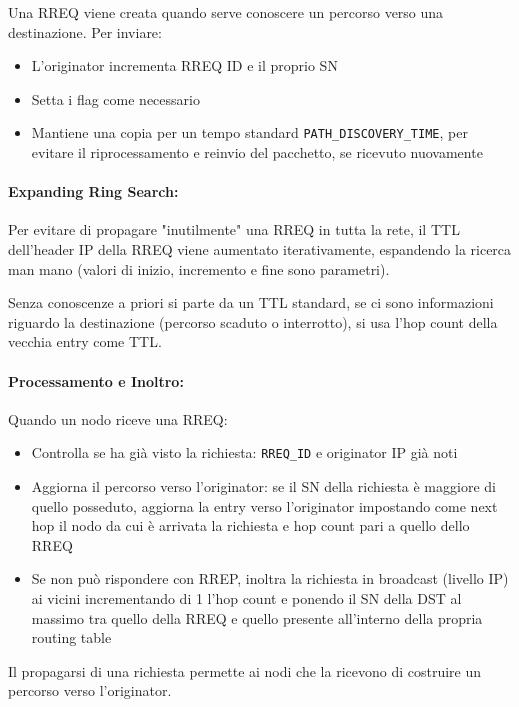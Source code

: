 Una RREQ viene creata quando serve conoscere un percorso verso una destinazione. Per inviare:
\begin{itemize}
    \item L'originator incrementa RREQ ID e il proprio SN
    
    \item Setta i flag come necessario 
    
    \item Mantiene una copia per un tempo standard \texttt{PATH\_DISCOVERY\_TIME}, per evitare il riprocessamento e reinvio del pacchetto, se ricevuto nuovamente
\end{itemize}

\paragraph{Expanding Ring Search:} Per evitare di propagare "inutilmente" una RREQ in tutta la rete, il TTL dell'header IP della RREQ viene aumentato iterativamente, espandendo la ricerca man mano (valori di inizio, incremento e fine sono parametri). 

Senza conoscenze a priori si parte da un TTL standard, se ci sono informazioni riguardo la destinazione (percorso scaduto o interrotto), si usa l'hop count della vecchia entry come TTL.

\paragraph{Processamento e Inoltro:} Quando un nodo riceve una RREQ: 
\begin{itemize}
    \item Controlla se ha già visto la richiesta: \texttt{RREQ\_ID} e originator IP già noti
    
    \item Aggiorna il percorso verso l'originator: se il SN della richiesta è maggiore di quello posseduto, aggiorna la entry verso l'originator impostando come next hop il nodo da cui è arrivata la richiesta e hop count pari a quello dello RREQ
    
    \item Se non può rispondere con RREP, inoltra la richiesta in broadcast (livello IP) ai vicini incrementando di 1 l'hop count e ponendo il SN della DST al massimo tra quello della RREQ e quello presente all'interno della propria routing table
\end{itemize}

Il propagarsi di una richiesta permette ai nodi che la ricevono di costruire un percorso verso l'originator.

